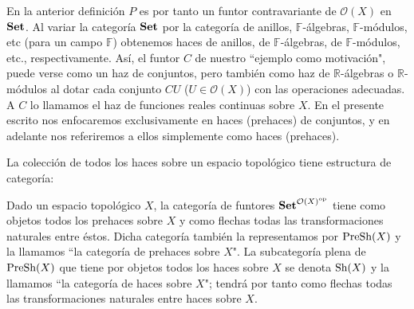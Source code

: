 En la anterior definición $P$ es por tanto un funtor contravariante de $\mathcal{O}(X)$ en $\normalfont{\textbf{Set}}$. Al variar la categoría $\normalfont{\textbf{Set}}$ por la categoría de anillos, $\mathbb{F}$-álgebras, $\mathbb{F}$-módulos, etc (para un campo $\mathbb{F}$) obtenemos haces de anillos, de $\mathbb{F}$-álgebras, de $\mathbb{F}$-módulos, etc., respectivamente. Así, el funtor $C$ de nuestro ``ejemplo como motivación", puede verse como un haz de conjuntos, pero también como haz de $\mathbb{R}$-álgebras o $\mathbb{R}$-módulos al dotar cada conjunto $CU$ ($U\in \mathcal{O}(X)$) con las operaciones adecuadas. A $C$ lo llamamos el haz de funciones reales continuas sobre $X$. En el presente escrito nos enfocaremos exclusivamente en haces (prehaces) de conjuntos, y en adelante nos referiremos a ellos simplemente como haces (prehaces).

La colección de todos los haces sobre un espacio topológico tiene estructura de categoría:
\begin{Def}
   Dado un espacio topológico $X$, la categoría de funtores $\normalfont{\textbf{Set}}^{{\mathcal{O}(X)}^{\text{op}}}$ tiene como objetos todos los prehaces sobre $X$ y como flechas todas las transformaciones naturales entre éstos. Dicha categoría también la representamos por $\normalfont{\text{PreSh}} (X)$ y la llamamos ``la categoría de prehaces sobre $X$". La subcategoría plena de $\normalfont{\text{PreSh}} (X)$ que tiene por objetos todos los haces sobre $X$ se denota $\normalfont{\text{Sh}}(X)$ y la llamamos ``la categoría de haces sobre $X$"; tendrá por tanto como flechas todas las transformaciones naturales entre haces sobre $X$. 
\end{Def}
